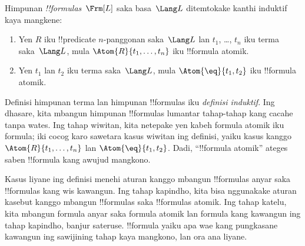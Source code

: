 \documentclass[../../../include/open-logic-section]{subfiles}
\begin{document}
\begin{defn}[Formula]
Himpunan \emph{!!{formula}s}~$\Frm[L]$ saka basa~$\Lang L$
ditemtokake kanthi induktif kaya mangkene:
\begin{enumerate}


\item Yen $R$ iku !!{predicate} $n$-panggonan saka~$\Lang L$ lan $t_1$, \dots,
  $t_n$ iku terma saka~$\Lang L$, mula $\Atom{R}{t_1,\ldots, t_n}$ iku
  !!{formula} atomik.

\item Yen $t_1$ lan $t_2$ iku terma saka~$\Lang L$, mula $\Atom{\eq}{t_1, t_2}$
  iku !!{formula} atomik.








\end{enumerate}
\end{defn}

\begin{explain}
Definisi himpunan terma lan himpunan !!{formula}s iku
\emph{definisi induktif}. Ing dhasare, kita mbangun himpunan
!!{formula}s lumantar tahap-tahap kang cacahe tanpa wates. Ing tahap
wiwitan, kita netepake yen kabeh formula atomik iku formula; iki
cocog karo sawetara kasus wiwitan ing definisi, yaiku kasus kanggo
%
%
$\Atom{R}{t_1,\dots,t_n}$ lan $\Atom{\eq}{t_1,t_2}$. Dadi, ``!!{formula}
atomik'' ateges saben !!{formula} kang awujud mangkono.

Kasus liyane ing definisi menehi aturan kanggo mbangun !!{formula}s
anyar saka !!{formula}s kang wis kawangun. Ing tahap kapindho, kita
bisa nggunakake aturan kasebut kanggo mbangun !!{formula}s saka
!!{formula}s atomik. Ing tahap katelu, kita mbangun formula anyar
saka formula atomik lan formula kang kawangun ing tahap kapindho, banjur
sateruse. !!{formula} yaiku apa wae kang pungkasane kawangun ing
sawijining tahap kaya mangkono, lan ora ana liyane.
\end{explain}
\end{document}
